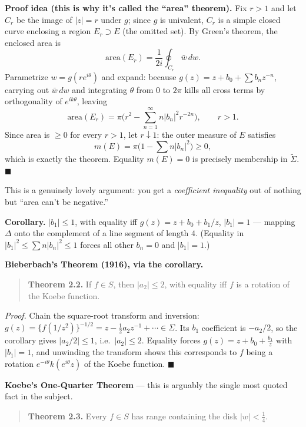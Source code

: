\documentclass[
]{book}
\theoremstyle{definition}
\theoremstyle{definition}
\theoremstyle{definition}
\theoremstyle{definition}
\theoremstyle{remark}
\begin{document}
\textbf{Proof idea (this is why it's called the ``area'' theorem).} Fix \(r>1\) and let \(C_r\) be the image of \(|z|=r\) under \(g\); since \(g\) is univalent, \(C_r\) is a simple closed curve enclosing a region \(E_r \supset E\) (the omitted set). By Green's theorem, the enclosed area is
\[\text{area}(E_r) = \frac{1}{2i}\oint_{C_r} \bar w\,dw.\]
Parametrize \(w=g(re^{i\theta})\) and expand: because \(g(z)=z+b_0+\sum b_n z^{-n}\), carrying out \(\bar w\,dw\) and integrating \(\theta\) from \(0\) to \(2\pi\) kills all cross terms by orthogonality of \(e^{ik\theta}\), leaving
\[\text{area}(E_r) = \pi\Big(r^2 - \sum_{n=1}^\infty n|b_n|^2 r^{-2n}\Big), \qquad r>1.\]
Since area is \(\ge 0\) for every \(r>1\), let \(r\downarrow 1\): the outer measure of \(E\) satisfies
\[m(E) = \pi\Big(1 - \sum n|b_n|^2\Big) \ge 0,\]
which is exactly the theorem. Equality \(m(E)=0\) is precisely membership in \(\tilde\Sigma\). \(\blacksquare\)

This is a genuinely lovely argument: you get a \emph{coefficient inequality} out of nothing but ``area can't be negative.''

\textbf{Corollary.} \(|b_1|\le 1\), with equality iff \(g(z) = z+b_0+b_1/z\), \(|b_1|=1\) --- mapping \(\Delta\) onto the complement of a line segment of length \(4\). (Equality in \(|b_1|^2 \le \sum n|b_n|^2 \le 1\) forces all other \(b_n=0\) and \(|b_1|=1\).)

\textbf{Bieberbach's Theorem (1916), via the corollary.}

\begin{quote}
\textbf{Theorem 2.2.} If \(f\in S\), then \(|a_2|\le 2\), with equality iff \(f\) is a rotation of the Koebe function.
\end{quote}

\emph{Proof.} Chain the square-root transform and inversion: \(g(z) = \{f(1/z^2)\}^{-1/2} = z - \tfrac12 a_2 z^{-1} + \cdots \in \Sigma\). Its \(b_1\) coefficient is \(-a_2/2\), so the corollary gives \(|a_2/2|\le 1\), i.e.~\(|a_2|\le 2\). Equality forces \(g(z) = z + b_0 + \frac{b_1}{z}\) with \(|b_1|=1\), and unwinding the transform shows this corresponds to \(f\) being a rotation \(e^{-i\theta}k(e^{i\theta}z)\) of the Koebe function. \(\blacksquare\)

\textbf{Koebe's One-Quarter Theorem} --- this is arguably the single most quoted fact in the subject.

\begin{quote}
\textbf{Theorem 2.3.} Every \(f\in S\) has range containing the disk \(|w|<\tfrac14\).
\end{quote}
\end{document}
